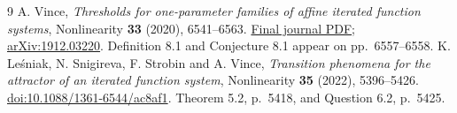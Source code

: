\documentclass[11pt]{article}
\begin{document}
\begin{thebibliography}{9}
A. Vince, \emph{Thresholds for one-parameter families of affine iterated
function systems}, Nonlinearity \textbf{33} (2020), 6541--6563.
\href{https://people.clas.ufl.edu/avince/files/Vince_2020_Nonlinearity.pdf}{Final journal PDF};
\href{https://arxiv.org/abs/1912.03220}{arXiv:1912.03220}.
Definition 8.1 and Conjecture 8.1 appear on pp.~6557--6558.
K. Le\'{s}niak, N. Snigireva, F. Strobin and A. Vince,
\emph{Transition phenomena for the attractor of an iterated function system},
Nonlinearity \textbf{35} (2022), 5396--5426.
\href{https://doi.org/10.1088/1361-6544/ac8af1}{doi:10.1088/1361-6544/ac8af1}.
Theorem 5.2, p.~5418, and Question 6.2, p.~5425.
\end{thebibliography}
\end{document}
